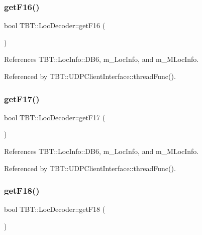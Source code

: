\subsubsection{\texorpdfstring{get\+F16()}{getF16()}}
{\footnotesize\ttfamily bool T\+B\+T\+::\+Loc\+Decoder\+::get\+F16 (\begin{DoxyParamCaption}{ }\end{DoxyParamCaption})\hspace{0.3cm}{\ttfamily [inline]}}



References T\+B\+T\+::\+Loc\+Info\+::\+D\+B6, m\+\_\+\+Loc\+Info, and m\+\_\+\+M\+Loc\+Info.



Referenced by T\+B\+T\+::\+U\+D\+P\+Client\+Interface\+::thread\+Func().

\mbox{\label{classTBT_1_1LocDecoder_a3197258036f35718c884aba8df521b54_a3197258036f35718c884aba8df521b54}} 
\subsubsection{\texorpdfstring{get\+F17()}{getF17()}}
{\footnotesize\ttfamily bool T\+B\+T\+::\+Loc\+Decoder\+::get\+F17 (\begin{DoxyParamCaption}{ }\end{DoxyParamCaption})\hspace{0.3cm}{\ttfamily [inline]}}



References T\+B\+T\+::\+Loc\+Info\+::\+D\+B6, m\+\_\+\+Loc\+Info, and m\+\_\+\+M\+Loc\+Info.



Referenced by T\+B\+T\+::\+U\+D\+P\+Client\+Interface\+::thread\+Func().

\mbox{\label{classTBT_1_1LocDecoder_a8a0533187d68e90e5a616dbcc934a111_a8a0533187d68e90e5a616dbcc934a111}} 
\subsubsection{\texorpdfstring{get\+F18()}{getF18()}}
{\footnotesize\ttfamily bool T\+B\+T\+::\+Loc\+Decoder\+::get\+F18 (\begin{DoxyParamCaption}{ }\end{DoxyParamCaption})\hspace{0.3cm}{\ttfamily [inline]}}



